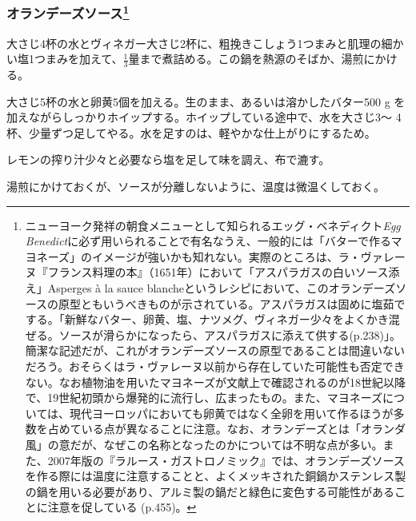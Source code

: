 \begin{recette}
{\subsubsection[オランデーズソース]{\texorpdfstring{オランデーズソース\footnote{ニューヨーク発祥の朝食メニューとして知られるエッグ・ベネディクト\emph{Egg
  Benedict}に必ず用いられることで有名なうえ、一般的には「バターで作るマヨネーズ」のイメージが強いかも知れない。実際のところは、ラ・ヴァレーヌ『フランス料理の本』（1651年）において「アスパラガスの白いソース添え」Asperges
  à la sauce
  blancheというレシピにおいて、このオランデーズソースの原型ともいうべきものが示されている。アスパラガスは固めに塩茹でする。「新鮮なバター、卵黄、塩、ナツメグ、ヴィネガー少々をよくかき混ぜる。ソースが滑らかになったら、アスパラガスに添えて供する(p.238)」。簡潔な記述だが、これがオランデーズソースの原型であることは間違いないだろう。おそらくはラ・ヴァレーヌ以前から存在していた可能性も否定できない。なお植物油を用いたマヨネーズが文献上で確認されるのが18世紀以降で、19世紀初頭から爆発的に流行し、広まったもの。また、マヨネーズについては、現代ヨーロッパにおいても卵黄ではなく全卵を用いて作るほうが多数を占めている点が異なることに注意。なお、オランデーズとは「オランダ風」の意だが、なぜこの名称となったのかについては不明な点が多い。また、2007年版の『ラルース・ガストロノミック』では、オランデーズソースを作る際には温度に注意することと、よくメッキされた銅鍋かステンレス製の鍋を用いる必要があり、アルミ製の鍋だと緑色に変色する可能性があることに注意を促している
  (p.455)。}}{オランデーズソース}}\label{sauce-hollandaise}}



大さじ4杯の水とヴィネガー大さじ2杯に、粗挽きこしょう1つまみと肌理の細かい塩1つまみを加えて、\(\frac{1}{3}\)量まで煮詰める。この鍋を熱源のそばか、湯煎にかける。

大さじ5杯の水と卵黄5個を加える。生のまま、あるいは溶かしたバター500 g
を加えながらしっかりホイップする。ホイップしている途中で、水を大さじ3〜
4杯、少量ずつ足してやる。水を足すのは、軽やかな仕上がりにするため。

レモンの搾り汁少々と必要なら塩を足して味を調え、布で漉す。

湯煎にかけておくが、ソースが分離しないように、温度は微温くしておく。


\end{recette}
